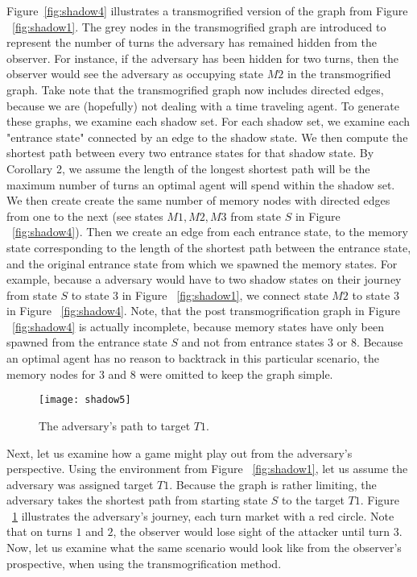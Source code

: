 Figure~\ref{fig:shadow4} illustrates a transmogrified version of the graph from Figure ~\ref{fig:shadow1}. The grey nodes in the transmogrified graph are introduced to represent the number of turns the adversary has remained hidden from the observer. For instance, if the adversary has been hidden for two turns, then the observer would see the adversary as occupying state $M2$ in the transmogrified graph. Take note that the transmogrified graph now includes directed edges, because we are (hopefully) not dealing with a time traveling agent. To generate these graphs, we examine each shadow set. For each shadow set, we examine each "entrance state" connected by an edge to the shadow state. We then compute the shortest path between every two entrance states for that shadow state. By Corollary 2, we assume the length of the longest shortest path will be the maximum number of turns an optimal agent will spend within the shadow set. We then create create the same number of memory nodes with directed edges from one to the next (see states $M1, M2, M3$ from state $S$ in Figure ~\ref{fig:shadow4}). Then we create an edge from each entrance state, to the memory state corresponding to the length of the shortest path between the entrance state, and the original entrance state from which we spawned the memory states. For example, because a adversary would have to two shadow states on their journey from state $S$ to state $3$ in Figure ~\ref{fig:shadow1}, we connect state $M2$ to state $3$ in Figure ~\ref{fig:shadow4}. Note, that the post transmogrification graph in Figure ~\ref{fig:shadow4} is actually incomplete, because memory states have only been spawned from the entrance state $S$ and not from entrance states $3$ or $8$. Because an optimal agent has no reason to backtrack in this particular scenario, the memory nodes for $3$ and $8$ were omitted to keep the graph simple.

\begin{figure}[h!]
\begin{center}

  \texttt{[image: shadow5]}
  \end{center}

  \caption{The adversary's path to target $T1$.}
  
  \label{fig:shadow5}
\end{figure}

Next, let us examine how a game might play out from the adversary's perspective.   Using the environment from Figure ~\ref{fig:shadow1}, let us assume the adversary was assigned target $T1$. Because the graph is rather limiting, the adversary takes the shortest path from starting state $S$ to the target $T1$. Figure ~\ref{fig:shadow5} illustrates the adversary's journey, each turn market with a red circle. Note that on turns $1$ and $2$, the observer would lose sight of the attacker until turn $3$. Now, let us examine what the same scenario would look like from the observer's prospective, when using the transmogrification method. 

